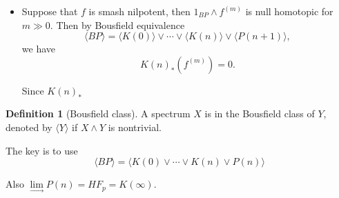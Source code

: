 \documentclass[11pt, oneside]{article}   	%
\theoremstyle{definition}
\newtheorem*{defn}{Definition}
\begin{document}
\begin{itemize}
	\item Suppose that $f$ is smash nilpotent, then $1_{BP}\wedge f^{(m)}$ is null homotopic for $m\gg 0$. Then by Bousfield equivalence
	\begin{equation}
		\langle BP\rangle=\langle K(0)\rangle\vee\cdots\vee \langle K(n)\rangle\vee \langle 
		P(n+1)\rangle,
	\end{equation}
	we have
	\begin{equation}
		K(n)_*(f^{(m)})=0.
	\end{equation}

	Since $K(n)_*$
\end{itemize}

\begin{defn}[Bousfield class]
	A spectrum $X$ is in the Bousfield class of $Y$, denoted by $\langle Y\rangle$ if $X\wedge Y$ is nontrivial.
\end{defn}
 
 	The key is to use
	\begin{equation}
		\langle BP\rangle= \langle K(0) \vee\cdots\vee K(n) \vee P(n)\rangle
	\end{equation}

	Also $\lim\limits_{\rightarrow}P(n)=HF_p=K(\infty)$.
 
\end{document}

